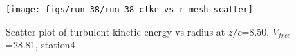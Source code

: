 \begin{figure}[H]
\centering
\texttt{[image: figs/run\_38/run\_38\_ctke\_vs\_r\_mesh\_scatter]}
\caption{Scatter plot of turbulent kinetic energy vs radius at $z/c$=8.50, $V_{free}$=28.81, station4}
\label{fig:run_38_ctke_vs_r_mesh_scatter}
\end{figure}


